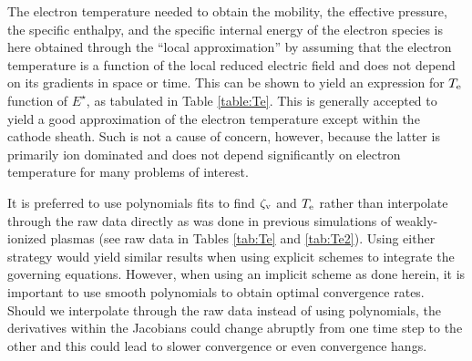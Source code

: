 \documentclass{warpdoc}
\begin{document}
The electron temperature needed to obtain the mobility, the effective pressure, the specific enthalpy, and the specific internal energy of the electron species is here obtained through the ``local approximation'' by assuming that the electron temperature is a function of the local reduced electric field and does not depend on its gradients in space or time. This can be shown to yield an expression for  $T_{\rm e}$ function of $E^\star$, as tabulated in Table \ref{table:Te}.  This is generally accepted to yield a good approximation of the electron temperature except within the cathode sheath. Such is not a cause of concern, however, because the latter is primarily ion dominated and does not depend significantly on electron temperature for many problems of interest.  

It is preferred to use polynomials fits to find $\zeta_{\rm v}$ and $T_{\rm e}$ rather than interpolate through the raw data directly as was done in previous simulations of weakly-ionized plasmas (see raw data in Tables \ref{tab:Te} and \ref{tab:Te2}). Using either strategy would yield similar results when using explicit schemes to integrate the governing equations. However, when using an implicit scheme as done herein, it is important to use smooth polynomials to obtain optimal convergence rates. Should we interpolate through the raw data instead of using polynomials, the derivatives within the Jacobians could change abruptly from one time step to the other and this could lead to slower convergence or even convergence hangs.











\appendix


  
  
\end{document}
